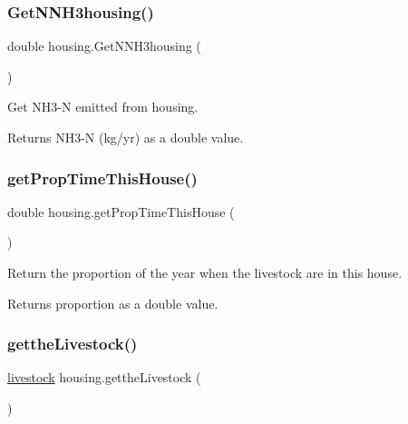 \subsubsection{\texorpdfstring{GetNNH3housing()}{GetNNH3housing()}}
{\footnotesize\ttfamily double housing.\+Get\+N\+N\+H3housing (\begin{DoxyParamCaption}{ }\end{DoxyParamCaption})\hspace{0.3cm}{\ttfamily [inline]}}



Get N\+H3-\/N emitted from housing. 

\begin{DoxyReturn}{Returns}
N\+H3-\/N (kg/yr) as a double value. 
\end{DoxyReturn}
\mbox{\label{classhousing_adc0b218cb4e93ed542c55d09979d0dc0}} 
\subsubsection{\texorpdfstring{getPropTimeThisHouse()}{getPropTimeThisHouse()}}
{\footnotesize\ttfamily double housing.\+get\+Prop\+Time\+This\+House (\begin{DoxyParamCaption}{ }\end{DoxyParamCaption})\hspace{0.3cm}{\ttfamily [inline]}}



Return the proportion of the year when the livestock are in this house. 

\begin{DoxyReturn}{Returns}
proportion as a double value. 
\end{DoxyReturn}
\mbox{\label{classhousing_ac8e88d4ccf32bc6f9a4fad60a35cd0ae}} 
\subsubsection{\texorpdfstring{gettheLivestock()}{gettheLivestock()}}
{\footnotesize\ttfamily \mbox{\hyperlink{classlivestock}{livestock}} housing.\+getthe\+Livestock (\begin{DoxyParamCaption}{ }\end{DoxyParamCaption})\hspace{0.3cm}{\ttfamily [inline]}}



